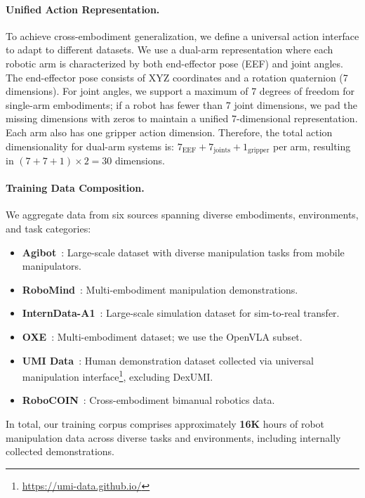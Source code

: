 \documentclass[onecolumn]{robbyant}           %
\begin{document}
\paragraph{Unified Action Representation.}
To achieve cross-embodiment generalization, we define a universal action interface to adapt to different datasets.
We use a dual-arm representation where each robotic arm is characterized by both end-effector pose (EEF) and joint angles.
The end-effector pose consists of XYZ coordinates and a rotation quaternion (7 dimensions).
For joint angles, we support a maximum of 7 degrees of freedom for single-arm embodiments; if a robot has fewer than 7 joint dimensions, we pad the missing dimensions with zeros to maintain a unified 7-dimensional representation.
Each arm also has one gripper action dimension.
Therefore, the total action dimensionality for dual-arm systems is: $7_{\text{EEF}} + 7_{\text{joints}} + 1_{\text{gripper}}$ per arm, resulting in $(7 + 7 + 1) \times 2 = 30$ dimensions.



\paragraph{Training Data Composition.}
We aggregate data from six sources spanning diverse embodiments, environments, and task categories:
\begin{itemize}[leftmargin=*, itemsep=2pt, topsep=2pt]
    \item \textbf{Agibot}~\cite{agibot}: Large-scale dataset with diverse manipulation tasks from mobile manipulators.%
    \item \textbf{RoboMind}~\cite{robomind}: Multi-embodiment manipulation demonstrations.%
    \item \textbf{InternData-A1}~\cite{interndata}: Large-scale simulation dataset for sim-to-real transfer.%
    \item \textbf{OXE}~\cite{oxe}: Multi-embodiment dataset; we use the OpenVLA subset.%
    \item \textbf{UMI Data}~\cite{umi,mvumi,vitamin,fastumi,datascalinglaws,maniwav}: Human demonstration dataset collected via universal manipulation interface\footnote{\url{https://umi-data.github.io/}}, excluding DexUMI. %
    \item \textbf{RoboCOIN}~\cite{robocoin}: Cross-embodiment bimanual robotics data.%
\end{itemize}
In total, our training corpus comprises approximately \textbf{16K} hours of robot manipulation data across diverse tasks and environments, including internally collected demonstrations.
\end{document}

